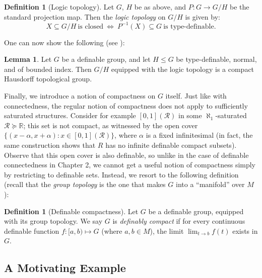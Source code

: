 \documentclass[a4paper]{report}
\newcommand{\ind}{\hspace{15pt}}
\newcommand{\R}{\mathbb{R}}
\newcommand{\Rns}{\mathcal{R}}
\renewcommand{\iff}{\Leftrightarrow}
\theoremstyle{definition}
\newtheorem{lem}[thm]{Lemma}
\newtheorem{defn}[thm]{Definition}
\theoremstyle{remstyle}
\begin{document}
\begin{defn}[Logic topology]
	Let $G$, $H$ be as above, and $P:G\to G/H$ be the standard projection map. Then the \emph{logic topology} on $G/H$ is given by:
	\begin{equation*}
		X \subseteq G/H \ \text{is closed}\ \iff \ P^{-1}(X)\subseteq G \ \text{is type-definable}.
	\end{equation*}
\end{defn}

\ind One can now show the following (see \cite{typedef}):

\begin{lem}\label{comHaus}
	Let $G$ be a definable group, and let $H\leq G$ be type-definable, normal, and of bounded index. Then $G/H$ equipped with the logic topology is a compact Hausdorff topological group.
\end{lem}

\ind Finally, we introduce a notion of compactness on $G$ itself. Just like with connectedness, the regular notion of compactness does not apply to sufficiently saturated structures. Consider for example $[0,1](\Rns)$ in some $\aleph_1$-saturated $\Rns\succeq\R$; this set is not compact, as witnessed by the open cover $\{(x-\alpha,x+\alpha):x\in[0,1](\Rns)\}$, where $\alpha$ is a fixed infinitesimal (in fact, the same construction shows that $R$ has no infinite definable compact subsets). Observe that this open cover is also definable, so unlike in the case of definable connectedness in Chapter 2, we cannot get a useful notion of compactness simply by restricting to definable sets. Instead, we resort to the following definition (recall that the \emph{group topology} is the one that makes $G$ into a ``manifold'' over $M$):

\begin{defn}[Definable compactness]
	Let $G$ be a definable group, equipped with its group topology. We say $G$ is \emph{definably compact} if for every continuous definable function $f:[a,b)\mapsto G$ (where $a,b\in M$), the limit $\lim_{t\to b}f(t)$ exists in $G$.
\end{defn}


\subsection{A Motivating Example}
\end{document}
